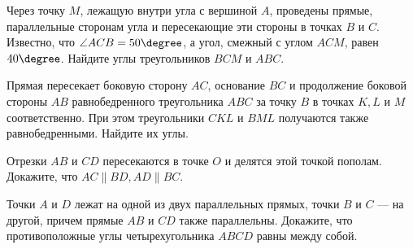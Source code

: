 \begin{class}[number=1]
\begin{listofex}
		\item Через точку \(M\), лежащую внутри угла с вершиной \(A\), проведены прямые, параллельные сторонам угла и пересекающие эти стороны в точках \(B\) и \(C\). Известно, что \(\angle ACB = 50\degree\), а угол, смежный с углом \(ACM\), равен \(40\degree\). Найдите углы треугольников \(BCM\) и \(ABC\).
		\item Прямая пересекает боковую сторону \(AC\), основание \(BC\) и продолжение боковой стороны \(AB\) равнобедренного треугольника \(ABC\) за точку \(B\) в точках \(K, L\) и \(M\) соответственно. При этом треугольники \(CKL\) и \(BML\) получаются также равнобедренными. Найдите их углы.
		\item Отрезки \(AB\) и \(CD\) пересекаются в точке \(O\) и делятся этой точкой пополам. Докажите, что \(AC \parallel BD, AD \parallel BC\).
		\item Точки \(A\) и \(D\) лежат на одной из двух параллельных прямых, точки \(B\) и \(C\) --- на другой, причем прямые \(AB\) и \(CD\) также параллельны. Докажите, что противоположные углы четырехугольника \(ABCD\) равны между собой.
	\end{listofex}
\end{class}

